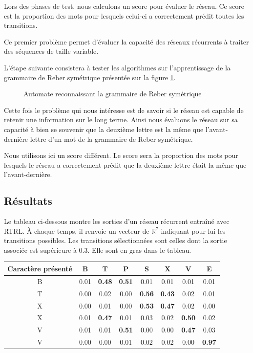 Lors des phases de test, nous calculons un score pour évaluer le réseau. Ce score est la proportion des mots pour lesquels celui-ci a correctement prédit toutes les transitions.

Ce premier problème permet d'évaluer la capacité des réseaux récurrents à traiter des séquences de taille variable.

L'étape suivante consistera à tester les algorithmes sur l'apprentissage de la grammaire de Reber symétrique présentée sur la figure \ref{Grammaire de Reber symétrique}.  
\begin{figure}[h!]
\begin{center}

\caption{Automate reconnaissant la grammaire de Reber symétrique}
\label{Grammaire de Reber symétrique}
\end{center}
\end{figure}

Cette fois le problème qui nous intéresse est de savoir si le réseau est capable de retenir une information sur le long terme. Ainsi nous évaluons le réseau sur sa capacité à bien se souvenir que la deuxième lettre est la même que l'avant-dernière lettre d'un mot de la grammaire de Reber symétrique.

Nous utilisons ici un score différent. Le score sera la proportion des mots pour lesquels le réseau a correctement prédit que la deuxième lettre était la même que l'avant-dernière.

\subsection{Résultats}

Le tableau ci-dessous montre les sorties d'un réseau récurrent entraîné avec RTRL. À chaque temps, il renvoie un vecteur de $\mathbb{R}^7$ indiquant pour lui les transitions possibles. Les transitions sélectionnées sont celles dont la sortie associée est supérieure à $0.3$. Elle sont en gras dans le tableau.

\begin{center}
\begin{tabular}{|c|c|c|c|c|c|c|c|}
\hline
Caractère présenté & B & T & P & S & X & V & E \\
\hline
B & 0.01 & \textbf{0.48} & \textbf{0.51} & 0.01 & 0.01 & 0.01 & 0.01 \\
\hline
T & 0.00 & 0.02 & 0.00 & \textbf{0.56} &  \textbf{0.43} & 0.02 & 0.01 \\
\hline
X & 0.00 & 0.01 & 0.00 & \textbf{0.53} & \textbf{0.47} & 0.02 & 0.00 \\
\hline
X & 0.01 & \textbf{0.47} & 0.01 & 0.03 & 0.02 & \textbf{0.50} & 0.02 \\
\hline
V & 0.01 & 0.01 & \textbf{0.51} & 0.00 & 0.00 & \textbf{0.47} & 0.03 \\
\hline
V & 0.00 & 0.00 & 0.01 & 0.02 & 0.02 & 0.00 & \textbf{0.97} \\
\hline
\end{tabular}
\end{center}

